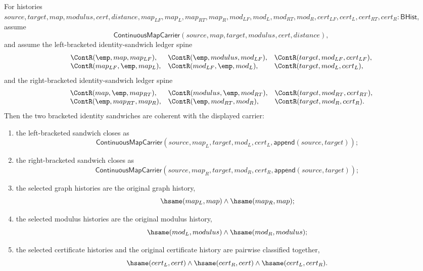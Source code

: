 \begin{theorem}
\label{thm:continuousmap-identity-sandwich-coherence}
For histories
$source,target,map,modulus,cert,distance,map_{LF},map_L,map_{RT},map_R,mod_{LF},mod_L,mod_{RT},mod_R,cert_{LF},cert_L,cert_{RT},cert_R:\mathsf{BHist}$,
assume
$$
\mathsf{ContinuousMapCarrier}(source,map,target,modulus,cert,distance),
$$
and assume the left-bracketed identity-sandwich ledger spine
$$
\begin{array}{lll}
\ContR(\emp,map,map_{LF}),&
\ContR(\emp,modulus,mod_{LF}),&
\ContR(target,mod_{LF},cert_{LF}),\\
\ContR(map_{LF},\emp,map_L),&
\ContR(mod_{LF},\emp,mod_L),&
\ContR(target,mod_L,cert_L),
\end{array}
$$
and the right-bracketed identity-sandwich ledger spine
$$
\begin{array}{lll}
\ContR(map,\emp,map_{RT}),&
\ContR(modulus,\emp,mod_{RT}),&
\ContR(target,mod_{RT},cert_{RT}),\\
\ContR(\emp,map_{RT},map_R),&
\ContR(\emp,mod_{RT},mod_R),&
\ContR(target,mod_R,cert_R).
\end{array}
$$
Then the two bracketed identity sandwiches are coherent with the displayed
carrier:
\begin{enumerate}
\item the left-bracketed sandwich closes as
$$
\mathsf{ContinuousMapCarrier}
(source,map_L,target,mod_L,cert_L,\mathsf{append}(source,target));
$$

\item the right-bracketed sandwich closes as
$$
\mathsf{ContinuousMapCarrier}
(source,map_R,target,mod_R,cert_R,\mathsf{append}(source,target));
$$

\item the selected graph histories are the original graph history,
$$
\hsame(map_L,map)\land \hsame(map_R,map);
$$

\item the selected modulus histories are the original modulus history,
$$
\hsame(mod_L,modulus)\land \hsame(mod_R,modulus);
$$

\item the selected certificate histories and the original certificate history
are pairwise classified together,
$$
\hsame(cert_L,cert)\land \hsame(cert_R,cert)\land \hsame(cert_L,cert_R).
$$
\end{enumerate}
\end{theorem}
